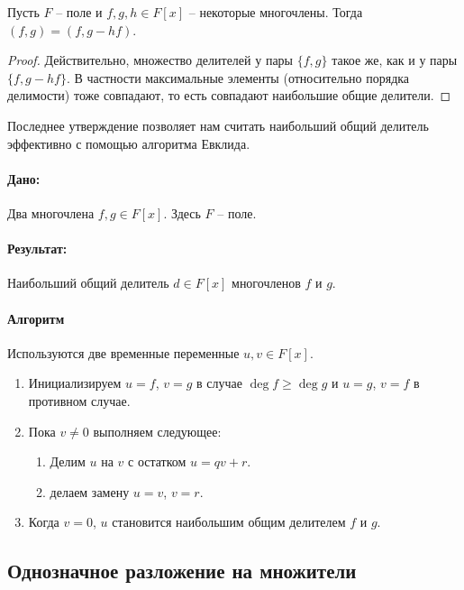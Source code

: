 \begin{claim}
Пусть $F$ -- поле и $f, g, h\in F[x]$ -- некоторые многочлены.
Тогда $(f, g) = (f, g - hf)$.
\end{claim}
\begin{proof}
Действительно, множество делителей у пары $\{f, g\}$ такое же, как и у пары $\{f, g-hf\}$.
В частности максимальные элементы (относительно порядка делимости) тоже совпадают, то есть совпадают наибольшие общие делители.
\end{proof}

Последнее утверждение позволяет нам считать наибольший общий делитель эффективно с помощью алгоритма Евклида.

\paragraph{Дано:}

Два многочлена $f, g\in F[x]$.
Здесь $F$ -- поле.

\paragraph{Результат:}

Наибольший общий делитель $d\in F[x]$ многочленов $f$ и $g$.

\paragraph{Алгоритм}

Используются две временные переменные $u, v\in F[x]$.

\begin{enumerate}
\item Инициализируем $u = f$, $v = g$ в случае $\deg f \geqslant \deg g$ и $u = g$, $v = f$ в противном случае.

\item Пока $v \neq 0$ выполняем следующее:
\begin{enumerate}
\item Делим $u$ на $v$ с остатком $u = q v + r$.

\item делаем замену $u = v$, $v = r$.
\end{enumerate}

\item Когда $v = 0$, $u$ становится наибольшим общим делителем $f$ и $g$.
\end{enumerate}


\subsection{Однозначное разложение на множители}

